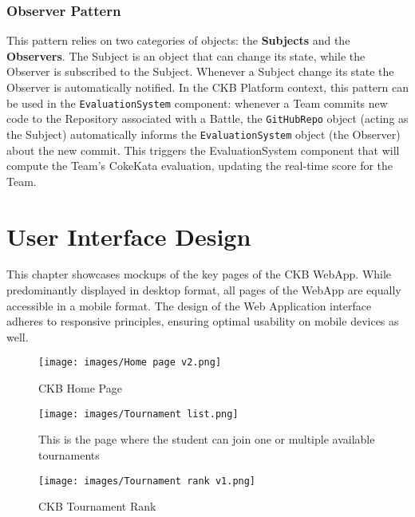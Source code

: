 \documentclass[a4paper, 11pt, titlepage]{article}
\begin{document}
\subsubsection*{Observer Pattern}
This pattern relies on two categories of objects: the \textbf{Subjects} and the \textbf{Observers}. The Subject is an object that can change its state, while the Observer is subscribed to the Subject. Whenever a Subject change its state the Observer is automatically notified. In the CKB Platform context, this pattern can be used in the \texttt{EvaluationSystem} component:  whenever a Team commits new code to the Repository associated with a Battle, the \texttt{GitHubRepo} object (acting as the Subject) automatically informs the \texttt{EvaluationSystem} object (the Observer) about the new commit. This triggers the EvaluationSystem component that will compute the Team's CokeKata evaluation, updating the real-time score for the Team.

\newpage


\section{User Interface Design}
This chapter showcases mockups of the key pages of the CKB WebApp. While predominantly displayed in desktop format, all pages of the WebApp are equally accessible in a mobile format. The design of the Web Application interface adheres to responsive principles, ensuring optimal usability on mobile devices as well.

\begin{figure}[H]
  \centering
  \texttt{[image: images/Home page v2.png]}
  \caption{CKB Home Page}
  \label{fig:Home_page}
\end{figure}

\begin{figure}[H]
  \centering
  \texttt{[image: images/Tournament list.png]}
  \caption{This is the page where the student can join one or multiple available tournaments}
  \label{fig:Tournament_list}
\end{figure}

\begin{figure}[H]
  \centering
  \texttt{[image: images/Tournament rank v1.png]}
  \caption{CKB Tournament Rank}
  \label{fig:Tournament_rank}
\end{figure}
\end{document}
